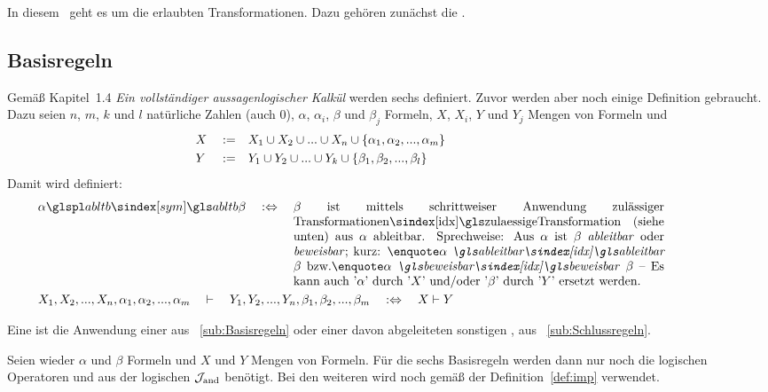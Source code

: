 In diesem \sectionname\ geht es um die erlaubten Transformationen. Dazu gehören zunächst die .

\subsection{Basisregeln}%
\label{sub:Basisregeln}

Gemäß \cite{bib:Rautenberg} Kapitel~1.4 \emph{Ein vollständiger aussagenlogischer Kalkül} werden sechs  definiert. Zuvor werden aber noch einige Definition gebraucht. Dazu seien $n$, $m$, $k$ und $l$ natürliche Zahlen (auch 0), $\alpha$, $\alpha_i$, $\beta$ und $\beta_j$ Formeln, $X$, $X_i$, $Y$ und $Y_j$ Mengen von Formeln und
\begin{align}
	&X&&:=&&X_1\cup X_2\cup...\cup X_n\cup\{\alpha_1,\alpha_2,...,\alpha_m\}
	\\
	&Y&&:=&&Y_1\cup Y_2\cup...\cup Y_k\cup\{\beta_1, \beta_2, ...,\beta_l \}
	&&&&&&&&&&&&&&&&&&&&
\end{align}
Damit wird definiert:
\begin{align}
	& \alpha \glsSym{abltb} \beta \quad \metadefeq \quad
	\parbox[t]{10.5cm}{%
		$\beta$ ist mittels schrittweiser Anwendung \glsIdxBg{zulaessigeTransformation}{zulässiger Transformationen} (siehe unten) aus $\alpha$ ableitbar.
		Sprechweise: Aus $\alpha$ ist $\beta$ \emph{ableitbar} oder \emph{beweisbar};
		kurz: \strqt{$\alpha$ \emph{\glsIdx{ableitbar}} $\beta$} \textbzw \strqt{$\alpha$ \emph{\glsIdx{beweisbar}} $\beta$}
		-- Es kann auch \symqt{$\alpha$} durch \symqt{$X$} und/oder \symqt{$\beta$} durch \symqt{$Y$} ersetzt werden.
	}
	\label{def:ableitbar} \\
	&            X_1, X_2, ...,X_n, \alpha_1, \alpha_2, ..., \alpha_m \quad
	\abltb \quad Y_1, Y_2, ...,Y_n,  \beta_1,  \beta_2,  ..., \beta_m \quad
	\metadefeq \quad X \abltb Y
	\label{def:ableitbarKurz} \formulatoleft
\end{align}

Eine \emph{} ist die Anwendung einer  aus \subsectionname~\vref{sub:Basisregeln} oder einer davon abgeleiteten sonstigen , \textzB aus \subsectionname~\vref{sub:Schlussregeln}.

Seien wieder $\alpha$ und $\beta$ Formeln und $X$ und $Y$ Mengen von Formeln.
Für die sechs Basisregeln werden dann nur noch die logischen Operatoren \symqt{$\lnot$} und \symqt{$\land$} aus der logischen  $\mathcal{J}_{\mathrm{and}}$ benötigt.
Bei den weiteren  wird noch \symqt{$\limp$} gemäß der Definition~\vref{def:imp} verwendet.

